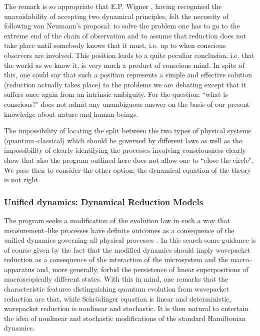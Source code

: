 \documentclass[10pt,a4paper]{article}
\begin{document}
The remark is so appropriate that E.P. Wigner \cite{wig1}, having
recognized the unavoidability of accepting two dynamical
principles, felt the necessity of following von Neumann's
proposal: to solve the problem one has to go to the extreme end of
the chain of observation and to assume that reduction does not
take place until somebody knows that it must, i.e. up to when
conscious observers are involved. This position leads to a quite
peculiar conclusion, i.e. that the world as we know it, is very
much a product of conscious mind. In spite of this, one could say
that such a position represents a simple and effective solution
(reduction actually takes place) to the problems we are debating
except that it suffers once again from an intrinsic ambiguity. For
the question: ``what is conscious?" does not admit any unambiguous
answer on the basis of our present knowledge about nature and
human beings.

The impossibility of locating the split between the two types of
physical systems (quantum--classical) which should be governed by
different laws as well as the impossibility of clearly identifying
the processes involving consciousness clearly show that also the
program outlined here does not allow one to ``close the circle".
We pass then to consider the other option: the dynamical equation
of the theory is not right.


\subsubsection{Unified dynamics: Dynamical Reduction Models}
\label{sec372}

The program seeks a modification of the evolution law in such a
way that measurement--like processes have definite outcomes as a
consequence of the unified dynamics governing all physical
processes \cite{heid,grw,csl,rel,cc}. In this search some guidance is
of course given by the fact that the modified dynamics should
imply wavepacket reduction as a consequence of the interaction of
the microsystem and the macro--apparatus and, more generally,
forbid the persistence of linear superpositions of macroscopically
different states. With this in mind, one remarks that the
characteristic features distinguishing quantum evolution from
wavepacket reduction are that, while Schr\"odinger equation is
linear and deterministic, wavepacket reduction is nonlinear and
stochastic. It is then natural to entertain the idea of nonlinear
and stochastic modifications of the standard Hamiltonian dynamics.
\end{document}
